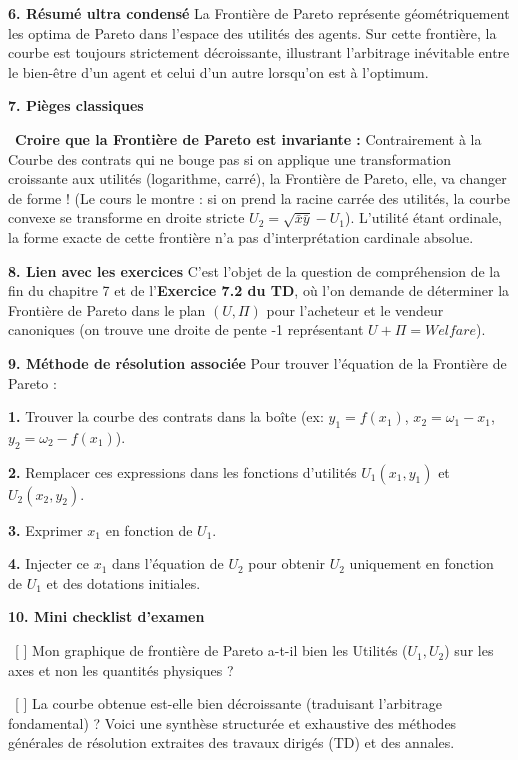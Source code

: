 \documentclass[11pt, a4paper]{report}
\begin{document}
\textbf{6. Résumé ultra condensé}
La Frontière de Pareto représente géométriquement les optima de Pareto dans l'espace des utilités des agents. Sur cette frontière, la courbe est toujours strictement décroissante, illustrant l'arbitrage inévitable entre le bien-être d'un agent et celui d'un autre lorsqu'on est à l'optimum. 

\textbf{7. Pièges classiques}
\par \textbullet\ \textbf{Croire que la Frontière de Pareto est invariante :} Contrairement à la Courbe des contrats qui ne bouge pas si on applique une transformation croissante aux utilités (logarithme, carré), la Frontière de Pareto, elle, va changer de forme ! (Le cours le montre : si on prend la racine carrée des utilités, la courbe convexe se transforme en droite stricte $U_2 = \sqrt{\bar{x}\bar{y}} - U_1$). L'utilité étant ordinale, la forme exacte de cette frontière n'a pas d'interprétation cardinale absolue.

\textbf{8. Lien avec les exercices}
C'est l'objet de la question de compréhension de la fin du chapitre 7 et de l'\textbf{Exercice 7.2 du TD}, où l'on demande de déterminer la Frontière de Pareto dans le plan $(U, \Pi)$ pour l'acheteur et le vendeur canoniques (on trouve une droite de pente -1 représentant $U + \Pi = Welfare$).

\textbf{9. Méthode de résolution associée}
Pour trouver l'équation de la Frontière de Pareto :
\par \textbf{1.} Trouver la courbe des contrats dans la boîte (ex: $y_1 = f(x_1)$, $x_2 = \omega_1 - x_1$, $y_2 = \omega_2 - f(x_1)$).
\par \textbf{2.} Remplacer ces expressions dans les fonctions d'utilités $U_1(x_1, y_1)$ et $U_2(x_2, y_2)$.
\par \textbf{3.} Exprimer $x_1$ en fonction de $U_1$.
\par \textbf{4.} Injecter ce $x_1$ dans l'équation de $U_2$ pour obtenir $U_2$ uniquement en fonction de $U_1$ et des dotations initiales. 

\textbf{10. Mini checklist d’examen}
\par \textbullet\ [ ] Mon graphique de frontière de Pareto a-t-il bien les Utilités ($U_1, U_2$) sur les axes et non les quantités physiques ?
\par \textbullet\ [ ] La courbe obtenue est-elle bien décroissante (traduisant l'arbitrage fondamental) ?
\newpage
Voici une synthèse structurée et exhaustive des méthodes générales de résolution extraites des travaux dirigés (TD) et des annales. 
\end{document}
